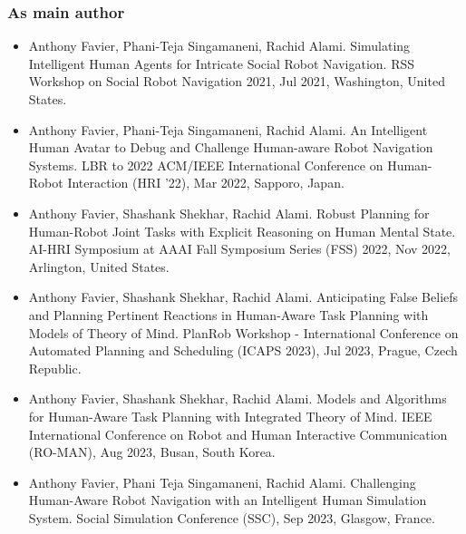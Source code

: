 \subsubsection*{As main author}
\begin{itemize}

    \item Anthony Favier, Phani-Teja Singamaneni, Rachid Alami. Simulating Intelligent Human Agents for Intricate Social Robot Navigation. RSS Workshop on Social Robot Navigation 2021, Jul 2021, Washington, United States. 
    \item Anthony Favier, Phani-Teja Singamaneni, Rachid Alami. An Intelligent Human Avatar to Debug and Challenge Human-aware Robot Navigation Systems. LBR to 2022 ACM/IEEE International Conference on Human-Robot Interaction (HRI '22), Mar 2022, Sapporo, Japan. 
    \item Anthony Favier, Shashank Shekhar, Rachid Alami. Robust Planning for Human-Robot Joint Tasks with Explicit Reasoning on Human Mental State. AI-HRI Symposium at AAAI Fall Symposium Series (FSS) 2022, Nov 2022, Arlington, United States. 
    \item Anthony Favier, Shashank Shekhar, Rachid Alami. Anticipating False Beliefs and Planning Pertinent Reactions in Human-Aware Task Planning with Models of Theory of Mind. PlanRob Workshop - International Conference on Automated Planning and Scheduling (ICAPS 2023), Jul 2023, Prague, Czech Republic. 
    \item Anthony Favier, Shashank Shekhar, Rachid Alami. Models and Algorithms for Human-Aware Task Planning with Integrated Theory of Mind. IEEE International Conference on Robot and Human Interactive Communication (RO-MAN), Aug 2023, Busan, South Korea. 
    \item Anthony Favier, Phani Teja Singamaneni, Rachid Alami. Challenging Human-Aware Robot Navigation with an Intelligent Human Simulation System. Social Simulation Conference (SSC), Sep 2023, Glasgow, France. 
    
\end{itemize}
    
